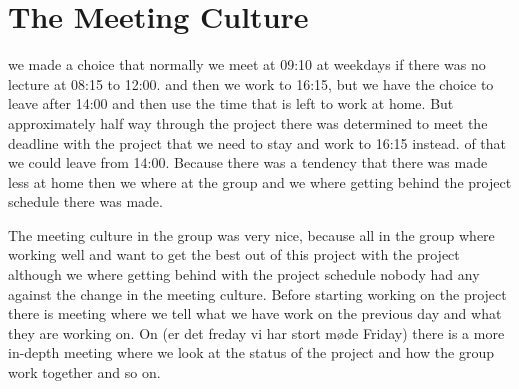 \section{The Meeting Culture}
we made a choice that normally we meet at 09:10 at weekdays if there was no lecture at 08:15 to 12:00. and then we work to 16:15, but we have the choice to leave after 14:00 and then use the time that is left to work at home. But approximately half way through the project there was determined to meet the deadline with the project that we need to stay and work to 16:15 instead. of that we could leave from 14:00. Because there was a tendency that there was made less at home then we where at the group and we where getting behind the project schedule there was made.

The meeting culture in the group was very nice, because all in the group where working well and want to get the best out of this project with the project although we where getting behind with the project schedule nobody had any against the change in the meeting culture. Before starting working on the project there is meeting where we tell what we have work on the previous day and what they are working on. On \fxfatal(er det freday vi har stort møde Friday) there is a more in-depth meeting where we look at the status of the project and how the group work together and so on.